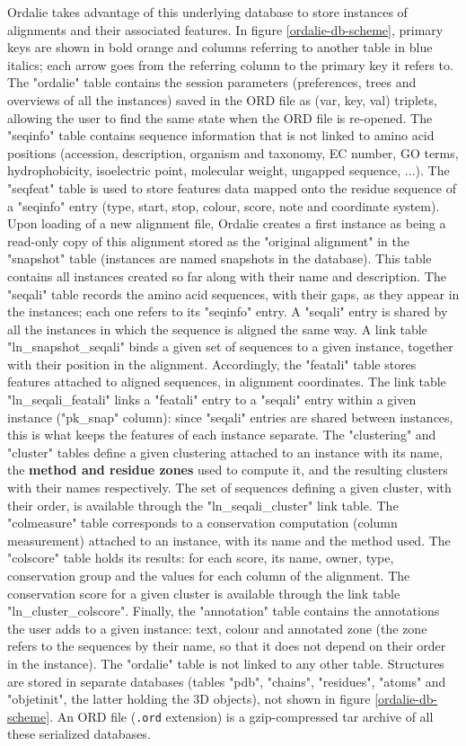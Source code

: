 \documentclass[a4paper]{article}
\begin{document}
Ordalie takes advantage of this underlying database to store instances of alignments and their associated features.
In figure \ref{ordalie-db-scheme}, primary keys are shown in bold orange and columns referring to another table in blue italics; each arrow goes from the referring column to the primary key it refers to.
The "ordalie" table contains the session parameters (preferences, trees and overviews of all the instances) saved in the ORD file as (var, key, val) triplets, allowing the user to find the same state when the ORD file is re-opened.
The "seqinfo" table contains sequence information that is not linked to amino acid positions (accession, description, organism and taxonomy, EC number, GO terms, hydrophobicity, isoelectric point, molecular weight, ungapped sequence, ...).
The "seqfeat" table is used to store features data mapped onto the residue sequence of a "seqinfo" entry (type, start, stop, colour, score, note and coordinate system).
Upon loading of a new alignment file, Ordalie creates a first instance as being a read-only copy of this alignment stored as the "original alignment" in the "snapshot" table (instances are named snapshots in the database). This table contains all instances created so far along with their name and description.
The "seqali" table records the amino acid sequences, with their gaps, as they appear in the instances; each one refers to its "seqinfo" entry. A "seqali" entry is shared by all the instances in which the sequence is aligned the same way.
A link table "ln\_snapshot\_seqali" binds a given set of sequences to a given instance, together with their position in the alignment.
Accordingly, the "featali" table stores features attached to aligned sequences, in alignment coordinates. The link table "ln\_seqali\_featali" links a "featali" entry to a "seqali" entry within a given instance ("pk\_snap" column): since "seqali" entries are shared between instances, this is what keeps the features of each instance separate.
The "clustering" and "cluster" tables define a given clustering attached to an instance with its name, the \textbf{method and residue zones} used to compute it, and the resulting clusters with their names respectively. 
The set of sequences defining a given cluster, with their order, is available through the "ln\_seqali\_cluster" link table.
The "colmeasure" table corresponds to a conservation computation (column measurement) attached to an instance, with its name and the method used. The "colscore" table holds its results: for each score, its name, owner, type, conservation group and the values for each column of the alignment.
The conservation score for a given cluster is available through the link table "ln\_cluster\_colscore".
Finally, the "annotation" table contains the annotations the user adds to a given instance: text, colour and annotated zone (the zone refers to the sequences by their name, so that it does not depend on their order in the instance).
The "ordalie" table is not linked to any other table.
Structures are stored in separate databases (tables "pdb", "chains", "residues", "atoms" and "objetinit", the latter holding the 3D objects), not shown in figure \ref{ordalie-db-scheme}.
An ORD file (\texttt{.ord} extension) is a gzip-compressed tar archive of all these serialized databases.
\end{document}

